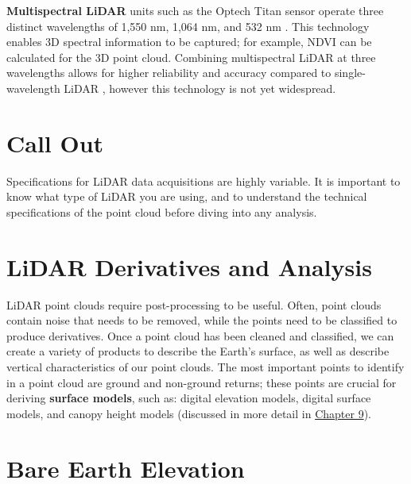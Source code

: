 \documentclass[
]{book}
\begin{document}
\textbf{Multispectral LiDAR} units such as the Optech Titan sensor operate three distinct wavelengths of 1,550 nm, 1,064 nm, and 532 nm \citep{morsy_multispectral_2017}. This technology enables 3D spectral information to be captured; for example, NDVI can be calculated for the 3D point cloud. Combining multispectral LiDAR at three wavelengths allows for higher reliability and accuracy compared to single-wavelength LiDAR \citep{morsy_multispectral_2017}, however this technology is not yet widespread.

\hypertarget{call-out-4}{%
\section*{Call Out}\label{call-out-4}}

Specifications for LiDAR data acquisitions are highly variable. It is important to know what type of LiDAR you are using, and to understand the technical specifications of the point cloud before diving into any analysis.

\hypertarget{lidar-derivatives-and-analysis}{%
\section{LiDAR Derivatives and Analysis}\label{lidar-derivatives-and-analysis}}

LiDAR point clouds require post-processing to be useful. Often, point clouds contain noise that needs to be removed, while the points need to be classified to produce derivatives. Once a point cloud has been cleaned and classified, we can create a variety of products to describe the Earth's surface, as well as describe vertical characteristics of our point clouds. The most important points to identify in a point cloud are ground and non-ground returns; these points are crucial for deriving \textbf{surface models}, such as: digital elevation models, digital surface models, and canopy height models (discussed in more detail in \href{https://ubc-geomatics-textbook.github.io/geomatics-textbook/raster-analysis-and-terrain-modelling.html}{Chapter 9}).

\hypertarget{bare-earth-elevation}{%
\section{Bare Earth Elevation}\label{bare-earth-elevation}}
\end{document}
